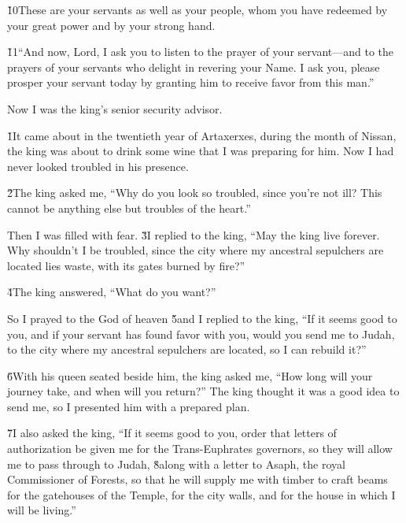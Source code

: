 \v{10}These are your servants as well as your people, whom you have redeemed by your great power and by your strong hand.

\v{11}``And now, Lord, I ask you to listen to the prayer of your servant---and to the prayers of your servants who delight in revering your Name. I ask you, please prosper your servant today by granting him to receive favor from this man.''

Now I was the king's senior security advisor.

\v{1}It came about in the twentieth year of Artaxerxes, during the month of Nissan, the king was about to drink some wine that I was preparing for him. Now I had never looked troubled in his presence.

\v{2}The king asked me, ``Why do you look so troubled, since you're not ill? This cannot be anything else but troubles of the heart.''

Then I was filled with fear. \v{3}I replied to the king, ``May the king live forever. Why shouldn't I be troubled, since the city where my ancestral sepulchers are located lies waste, with its gates burned by fire?''

\v{4}The king answered, ``What do you want?''

So I prayed to the God of heaven \v{5}and I replied to the king, ``If it seems good to you, and if your servant has found favor with you, would you send me to Judah, to the city where my ancestral sepulchers are located, so I can rebuild it?''

\v{6}With his queen seated beside him, the king asked me, ``How long will your journey take, and when will you return?'' The king thought it was a good idea to send me, so I presented him with a prepared plan.

\v{7}I also asked the king, ``If it seems good to you, order that letters of authorization be given me for the Trans-Euphrates governors, so they will allow me to pass through to Judah, \v{8}along with a letter to Asaph, the royal Commissioner of Forests, so that he will supply me with timber to craft beams for the gatehouses of the Temple, for the city walls, and for the house in which I will be living.''


